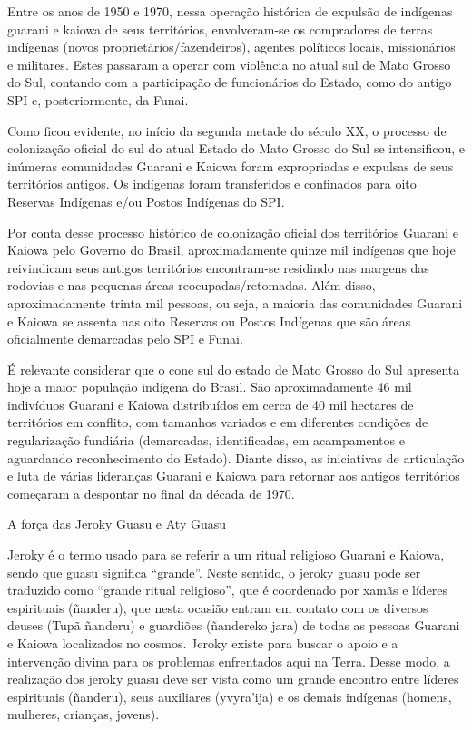 \documentclass{article}
\begin{document}
Entre os anos de 1950 e 1970, nessa opera\c{c}\~ao hist\'orica de
expuls\~ao de ind\'igenas guarani e kaiowa de seus territ\'orios,
envolveram-se os compradores de terras ind\'igenas (novos
propriet\'arios/fazendeiros), agentes pol\'iticos locais,
mission\'arios e militares. Estes passaram a operar com viol\^encia no
atual sul de Mato Grosso do Sul, contando com a participa\c{c}\~ao de
funcion\'arios do Estado, como do antigo SPI e, posteriormente, da
Funai. 

Como ficou evidente, no in\'icio da segunda metade do s\'eculo XX, o
processo de coloniza\c{c}\~ao oficial do sul do atual Estado do Mato
Grosso do Sul se intensificou, e in\'umeras comunidades Guarani e
Kaiowa foram expropriadas e expulsas de seus territ\'orios antigos. Os
ind\'igenas foram transferidos e confinados para oito Reservas
Ind\'igenas e/ou Postos Ind\'igenas do SPI. 

Por conta desse processo hist\'orico de coloniza\c{c}\~ao oficial dos
territ\'orios Guarani e Kaiowa pelo Governo do Brasil, aproximadamente
quinze mil ind\'igenas que hoje reivindicam seus antigos territ\'orios
encontram-se residindo nas margens das rodovias e nas pequenas \'areas
reocupadas/retomadas. Al\'em disso, aproximadamente trinta mil pessoas,
ou seja, a maioria das comunidades Guarani e Kaiowa se assenta nas oito
Reservas ou Postos Ind\'igenas que s\~ao \'areas oficialmente
demarcadas pelo SPI e Funai. 

\'E relevante considerar que o cone sul do estado de Mato Grosso do Sul
apresenta hoje a maior popula\c{c}\~ao ind\'igena do Brasil. S\~ao
aproximadamente 46 mil indiv\'iduos Guarani e Kaiowa distribu\'idos em
cerca de 40 mil hectares de territ\'orios em conflito, com tamanhos
variados e em diferentes condi\c{c}\~oes de regulariza\c{c}\~ao
fundi\'aria (demarcadas, identificadas, em acampamentos e aguardando
reconhecimento do Estado). Diante disso, as iniciativas de
articula\c{c}\~ao e luta de v\'arias lideran\c{c}as Guarani e Kaiowa
para retornar aos antigos territ\'orios come\c{c}aram a despontar no
final da d\'ecada de 1970.

A for\c{c}a das Jeroky Guasu e Aty Guasu

Jeroky \'e o termo usado para se referir a um ritual religioso Guarani e
Kaiowa, sendo que guasu significa
{\textquotedblleft}grande{\textquotedblright}. Neste sentido, o jeroky
guasu pode ser traduzido como {\textquotedblleft}grande ritual
religioso{\textquotedblright}, que \'e coordenado por xam\~as e
l\'ideres espirituais (\~nanderu), que nesta ocasi\~ao entram em
contato com os diversos deuses (Tup\~a \~nanderu) e guardi\~oes
(\~nandereko jara) de todas as pessoas Guarani e Kaiowa localizados no
cosmos. Jeroky existe para buscar o apoio e a interven\c{c}\~ao divina
para os problemas enfrentados aqui na Terra. Desse modo, a
realiza\c{c}\~ao dos jeroky guasu deve ser vista como um grande
encontro entre l\'ideres espirituais (\~nanderu), seus auxiliares
(yvyra{\textquoteright}ija) e os demais ind\'igenas (homens, mulheres,
crian\c{c}as, jovens). 
\end{document}
